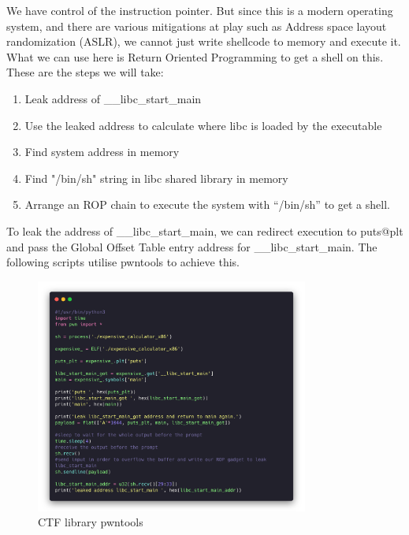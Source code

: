 We have control of the instruction pointer. But since this is a modern operating
system, and there are various mitigations at play such as Address space layout
randomization (ASLR), we cannot just write shellcode to memory and execute it.
What we can use here is Return Oriented Programming to get a shell on this.
These are the steps we will take:

\begin{enumerate}
  \item Leak address of \_\_libc\_start\_main
  \item Use the leaked address to calculate where libc is loaded by the
  executable
  \item Find system address in memory
  \item Find "/bin/sh" string in libc shared library in memory
  \item Arrange an ROP chain to execute the system with ``/bin/sh'' to get
  a shell.
\end{enumerate}
\newpage
To leak the address of \_\_libc\_start\_main, we can redirect execution to
puts@plt and pass the Global Offset Table entry address for \_\_libc\_start\_main.
The following scripts utilise pwntools to achieve this.

\begin{figure}[H]
  \centering
  \includegraphics[width=0.8\textwidth]{figures/pwntools}
  \caption{CTF library pwntools}
  \label{f:pwntools}
\end{figure}

